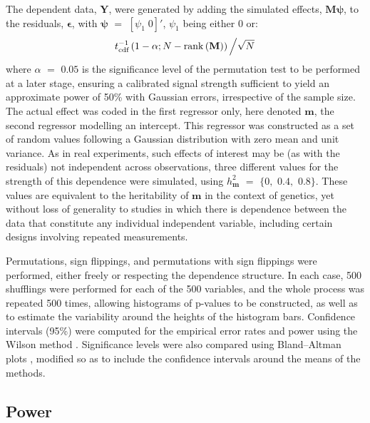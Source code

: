 The dependent data, $\mathbf{Y}$, were generated by adding the simulated effects, $\mathbf{M}\boldsymbol{\psi}$, to the residuals, $\boldsymbol{\epsilon}$, with $\boldsymbol{\psi}$ $=$ $[\psi_1 \; 0]'$, $\psi_1$ being either 0 or:
$$t^{-1}_{\text{cdf}}\left(1-\alpha ; N-\mathrm{rank}\left(\mathbf{M}\right)\right)\left/\sqrt{N}\right.$$
where $\alpha$ $=$ $0.05$ is the significance level of the permutation test to be performed at a later stage, ensuring a calibrated signal strength sufficient to yield an approximate power of 50\% with Gaussian errors, irrespective of the sample size. The actual effect was coded in the first regressor only, here denoted $\mathbf{m}$, the second regressor modelling an intercept. This regressor was constructed as a set of random values following a Gaussian distribution with zero mean and unit variance. As in real experiments, such effects of interest may be (as with the residuals) not independent across observations, three different values for the strength of this dependence were simulated, using $h_{\mathbf{m}}^{2}$ $=$ $\{0,$ $0.4,$ $0.8\}$. These values are equivalent to the heritability of $\mathbf{m}$ in the context of genetics, yet without loss of generality to studies in which there is dependence between the data that constitute any individual independent variable, including certain designs involving repeated measurements.

Permutations, sign flippings, and permutations with sign flippings were performed, either freely or respecting the dependence structure. In each case, 500 shufflings were performed for each of the 500 variables, and the whole process was repeated 500 times, allowing histograms of p-values to be constructed, as well as to estimate the variability around the heights of the histogram bars. Confidence intervals (95\%) were computed for the empirical error rates and power using the Wilson method \citep{Wilson1927}. Significance levels were also compared using Bland--Altman plots \citep{Bland1986}, modified so as to include the confidence intervals around the means of the methods.

\subsection{Power}

